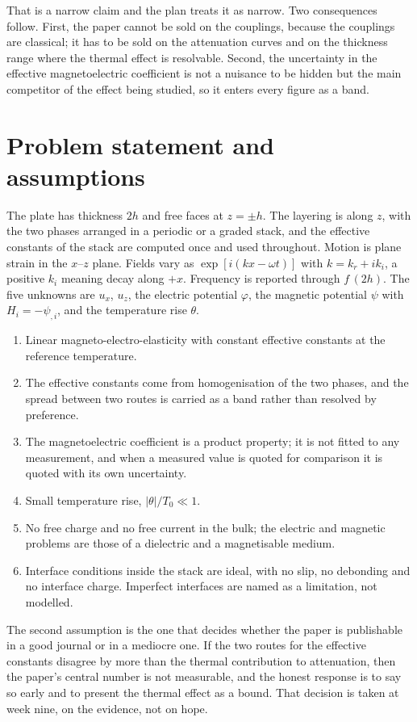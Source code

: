 \documentclass[11pt]{article}
\begin{document}
That is a narrow claim and the plan treats it as narrow. Two consequences follow. First, the paper cannot be
sold on the couplings, because the couplings are classical; it has to be sold on the attenuation curves and
on the thickness range where the thermal effect is resolvable. Second, the uncertainty in the effective
magnetoelectric coefficient is not a nuisance to be hidden but the main competitor of the effect being
studied, so it enters every figure as a band.

\section{Problem statement and assumptions}

The plate has thickness $2h$ and free faces at $z=\pm h$. The layering is along $z$, with the two phases
arranged in a periodic or a graded stack, and the effective constants of the stack are computed once and
used throughout. Motion is plane strain in the $x$--$z$ plane. Fields vary as $\exp[i(kx-\omega t)]$ with
$k=k_r+ik_i$, a positive $k_i$ meaning decay along $+x$. Frequency is reported through $f\,(2h)$. The five
unknowns are $u_x$, $u_z$, the electric potential $\varphi$, the magnetic potential $\psi$ with
$H_i=-\psi_{,i}$, and the temperature rise $\theta$.

\begin{enumerate}
\item Linear magneto-electro-elasticity with constant effective constants at the reference temperature.
\item The effective constants come from homogenisation of the two phases, and the spread between two routes
is carried as a band rather than resolved by preference.
\item The magnetoelectric coefficient is a product property; it is not fitted to any measurement, and when a
measured value is quoted for comparison it is quoted with its own uncertainty.
\item Small temperature rise, $|\theta|/T_0\ll1$.
\item No free charge and no free current in the bulk; the electric and magnetic problems are those of a
dielectric and a magnetisable medium.
\item Interface conditions inside the stack are ideal, with no slip, no debonding and no interface charge.
Imperfect interfaces are named as a limitation, not modelled.
\end{enumerate}

The second assumption is the one that decides whether the paper is publishable in a good journal or in a
mediocre one. If the two routes for the effective constants disagree by more than the thermal contribution to
attenuation, then the paper's central number is not measurable, and the honest response is to say so early
and to present the thermal effect as a bound. That decision is taken at week nine, on the evidence, not on
hope.
\end{document}
